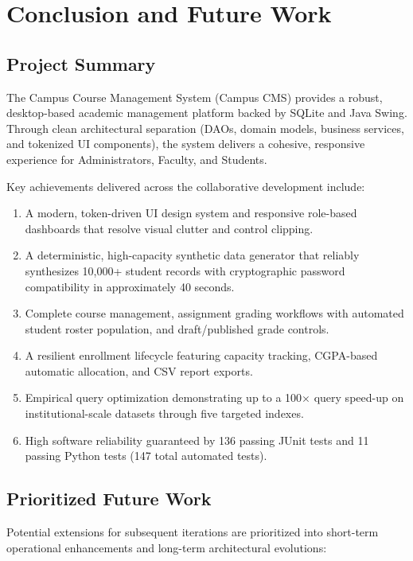 \section{Conclusion and Future Work}
\label{sec:conclusion}

\subsection{Project Summary}
The Campus Course Management System (Campus CMS) provides a robust, desktop-based academic management platform backed by SQLite and Java Swing. Through clean architectural separation (DAOs, domain models, business services, and tokenized UI components), the system delivers a cohesive, responsive experience for Administrators, Faculty, and Students.

Key achievements delivered across the collaborative development include:
\begin{enumerate}
    \item A modern, token-driven UI design system and responsive role-based dashboards that resolve visual clutter and control clipping.
    \item A deterministic, high-capacity synthetic data generator that reliably synthesizes 10{,}000+ student records with cryptographic password compatibility in approximately 40 seconds.
    \item Complete course management, assignment grading workflows with automated student roster population, and draft/published grade controls.
    \item A resilient enrollment lifecycle featuring capacity tracking, CGPA-based automatic allocation, and CSV report exports.
    \item Empirical query optimization demonstrating up to a 100$\times$ query speed-up on institutional-scale datasets through five targeted indexes.
    \item High software reliability guaranteed by 136 passing JUnit tests and 11 passing Python tests (147 total automated tests).
\end{enumerate}

\subsection{Prioritized Future Work}
Potential extensions for subsequent iterations are prioritized into short-term operational enhancements and long-term architectural evolutions:

